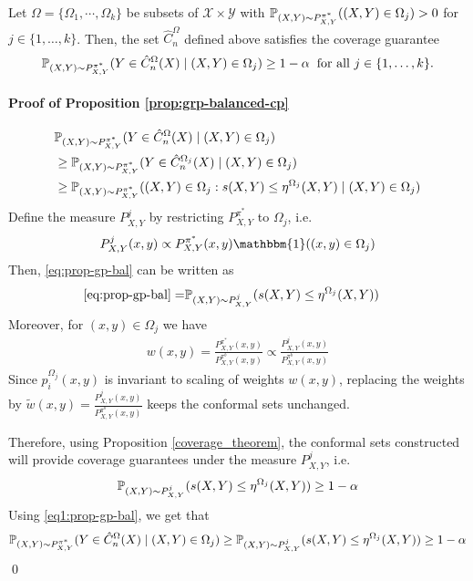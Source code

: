 \begin{proposition}\label{prop:grp-balanced-cp}
Let $\Omega = \{\Omega_1, \cdots, \Omega_k \}$ be subsets of $\mathcal{X} \times \mathcal{Y}$ with $\mathbb{P}_{(X,Y)\sim P^{\pi^*}_{X,Y}}((X,Y) \in \Omega_j) > 0$ for $j\in \{1, \dots, k\}$. Then, the set $\hat{C}_n^{\Omega}$ defined above satisfies the coverage guarantee 
\begin{align}
    \mathbb{P}_{(X,Y)\sim P^{\pi^*}_{X,Y}}(Y \in \hat{C}_n^\Omega(X) \mid (X, Y) \in  \Omega_j) \geq 1-\alpha \hspace{0.2cm} \textup{for all $j\in \{1, \dots, k\}$.} \nonumber
\end{align}
\end{proposition}

\paragraph{Proof of Proposition \ref{prop:grp-balanced-cp}}

\begin{align}
    &\mathbb{P}_{(X,Y)\sim P^{\pi^*}_{X,Y}}(Y \in \hat{C}_n^\Omega(X) \mid (X, Y) \in  \Omega_j) \nonumber\\
    &\geq \mathbb{P}_{(X,Y)\sim P^{\pi^*}_{X,Y}}(Y \in \hat{C}_n^{\Omega_j}(X) \mid (X, Y) \in  \Omega_j) \nonumber \\
    &\geq \mathbb{P}_{(X,Y)\sim P^{\pi^*}_{X,Y}}( (X, Y) \in \Omega_j: s(X,Y) \leq  \eta^{\Omega_j}(X, Y) \mid (X, Y) \in \Omega_j) \label{eq:prop-gp-bal}  
\end{align}
Define the measure $P^{j}_{X, Y}$ by restricting $P^{\pi^*}_{X, Y}$ to $\Omega_j$, i.e.
\[
P^j_{X, Y}(x, y) \propto P^{\pi^*}_{X, Y}(x, y) \mathbbm{1}((x, y) \in \Omega_j)
\]
Then, \eqref{eq:prop-gp-bal} can be written as
\begin{align}
    \eqref{eq:prop-gp-bal} =& \mathbb{P}_{(X, Y) \sim P^{j}_{X, Y}}(s(X,Y) \leq  \eta^{\Omega_j}(X, Y)) \label{eq1:prop-gp-bal}
\end{align}
Moreover, for $(x, y) \in \Omega_j$ we have
\begin{align}
    w(x, y) = \frac{P^{\pi^*}_{X, Y}(x, y)}{P^{\pi^b}_{X, Y}(x, y)} \propto \frac{P^{j}_{X, Y}(x, y)}{P^{\pi^b}_{X, Y}(x, y)} \nonumber
\end{align}
Since $p_i^{\Omega_j}(x, y)$ is invariant to scaling of weights $w(x, y)$, replacing the weights by $\tilde{w}(x, y) = \frac{P^{j}_{X, Y}(x, y)}{P^{\pi^b}_{X, Y}(x, y)}$ keeps the conformal sets unchanged. 

Therefore, using Proposition \ref{coverage_theorem}, the conformal sets constructed will provide coverage guarantees under the measure $P^{j}_{X, Y}$, i.e.
\begin{align}
    \mathbb{P}_{(X, Y) \sim P^{j}_{X, Y}}(s(X,Y) \leq  \eta^{\Omega_j}(X, Y)) \geq 1-\alpha \nonumber
\end{align}
Using \eqref{eq1:prop-gp-bal}, we get that
\begin{align}
    \mathbb{P}_{(X,Y)\sim P^{\pi^*}_{X,Y}}(Y \in \hat{C}_n^\Omega(X) \mid (X, Y) \in  \Omega_j) \geq \mathbb{P}_{(X, Y) \sim P^{j}_{X, Y}}(s(X,Y) \leq  \eta^{\Omega_j}(X, Y)) \geq 1-\alpha \nonumber
\end{align}
\qed

